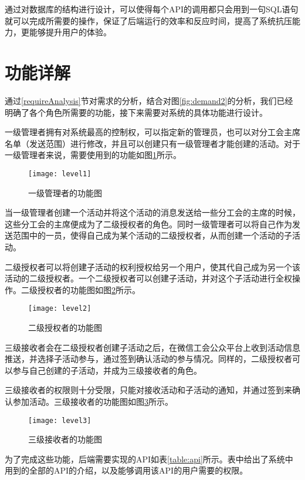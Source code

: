 通过对数据库的结构进行设计，可以使得每个API的调用都只会用到一句SQL语句就可以完成所需要的操作，保证了后端运行的效率和反应时间，提高了系统抗压能力，更能够提升用户的体验。

\section{功能详解}

通过\ref{requireAnalysis}节对需求的分析，结合对图\ref{fig:demand2}的分析，我们已经明确了各个角色所需要的功能，接下来需要对系统的具体功能进行设计。

一级管理者拥有对系统最高的控制权，可以指定新的管理员，也可以对分工会主席名单（发送范围）进行修改，并且可以创建只有一级管理者才能创建的活动。对于一级管理者来说，需要使用到的功能如图\ref{fig:level1}所示。

\begin{figure}[H]
  \centering
  \texttt{[image: level1]}
  \caption{一级管理者的功能图}
  \label{fig:level1}
\end{figure}

当一级管理者创建一个活动并将这个活动的消息发送给一些分工会的主席的时候，这些分工会的主席便成为了二级授权者的角色。同时一级管理者可以将自己作为发送范围中的一员，使得自己成为某个活动的二级授权者，从而创建一个活动的子活动。

二级授权者可以将创建子活动的权利授权给另一个用户，使其代自己成为另一个该活动的二级授权者。一个二级授权者可以创建子活动，并对这个子活动进行全权操作。二级授权者的功能图如图\ref{fig:level2}所示。

\begin{figure}[H]
  \centering
  \texttt{[image: level2]}
  \caption{二级授权者的功能图}
  \label{fig:level2}
\end{figure}

三级接收者会在二级授权者创建子活动之后，在微信工会公众平台上收到活动信息推送，并选择子活动参与，通过签到确认活动的参与情况。同样的，二级授权者可以参与自己创建的子活动，并成为三级接收者的角色。

三级接收者的权限则十分受限，只能对接收活动和子活动的通知，并通过签到来确认参加活动。三级接收者的功能图如图\ref{fig:level3}所示。

\begin{figure}[H]
  \centering
  \texttt{[image: level3]}
  \caption{三级接收者的功能图}
  \label{fig:level3}
\end{figure}

为了完成这些功能，后端需要实现的API如表\ref{table:api}所示。表中给出了系统中用到的全部的API的介绍，以及能够调用该API的用户需要的权限。

